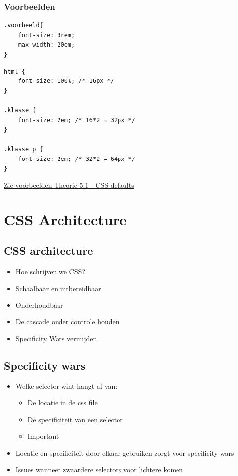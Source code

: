 \documentclass{article}
\begin{document}
\subsubsection{Voorbeelden}
\begin{lstlisting}
.voorbeeld{
    font-size: 3rem;
    max-width: 20em;
}

\end{lstlisting}


\begin{lstlisting}
html {
    font-size: 100%; /* 16px */
}
    
.klasse {
    font-size: 2em; /* 16*2 = 32px */
}

.klasse p {
    font-size: 2em; /* 32*2 = 64px */
}

\end{lstlisting}

\underline{Zie voorbeelden Theorie 5.1 - CSS defaults}


\section{CSS Architecture}
\subsection{CSS architecture}
\begin{itemize}
    \item Hoe schrijven we CSS?
    \item Schaalbaar en uitbereidbaar
    \item Onderhoudbaar
    \item De cascade onder controle houden
    \item Specificity Wars vermijden
\end{itemize}

\subsection{Specificity wars}
\begin{itemize}
    \item Welke selector wint hangt af van:
    \begin{itemize}
        \item De locatie in de css file
        \item De specificiteit van een selector
        \item Important
    \end{itemize}
    \item Locatie en specificiteit door elkaar gebruiken zorgt voor specificity wars
    \item Issues wanneer zwaardere selectors voor lichtere komen
\end{itemize}
\end{document}
